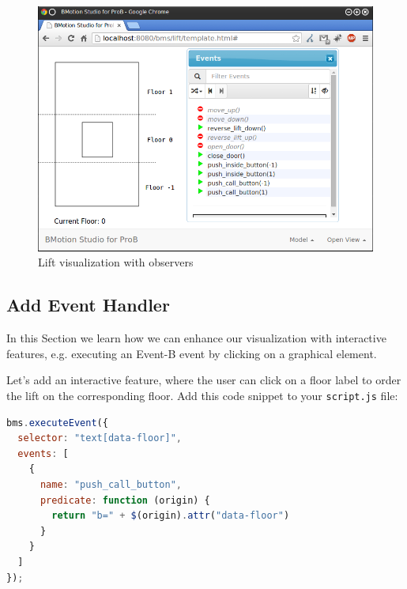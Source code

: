 \begin{figure}[!ht]
\begin{center}
	\includegraphics[width=12cm]{img/tutorial/tut_04.png}
	\caption{Lift visualization with observers}
	\label{fig_tut_04_running2}
\end{center}
\end{figure}

\subsection{Add Event Handler}

In this Section we learn how we can enhance our visualization with interactive features, e.g. executing an Event-B event by clicking on a graphical element.


Let's add an interactive feature, where the user can click on a floor label to order the lift on the corresponding floor.
Add this code snippet to your \texttt{script.js} file:
\newpage
\begin{lstlisting}[language=JavaScript, caption={Example of an Execute Event Handler (JavaScript)}]
bms.executeEvent({
  selector: "text[data-floor]",
  events: [
    {
      name: "push_call_button", 
      predicate: function (origin) {
        return "b=" + $(origin).attr("data-floor")
      }
    }
  ]
});
\end{lstlisting}

